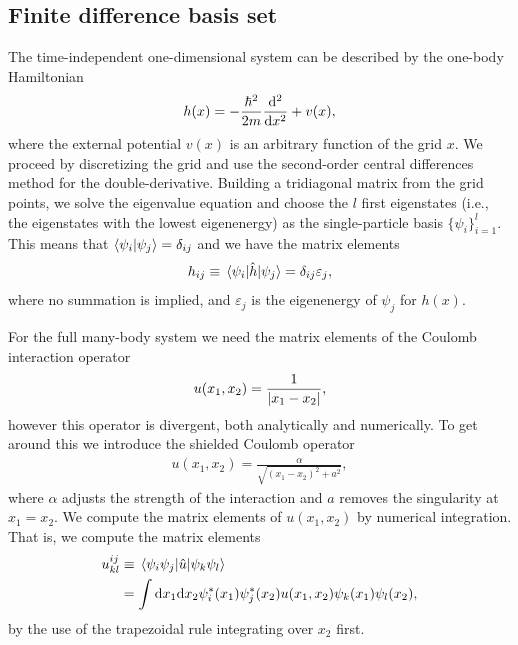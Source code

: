 \documentclass[twocolumn,superscriptaddress,unsortedaddress,
 amsmath,amssymb,
 aps,
]{revtex4-2}
\begin{document}
    \subsection{Finite difference basis set}
        The time-independent one-dimensional system can be described by the one-body
        Hamiltonian
        \begin{align}
            h(x) = -\frac{\hbar^2}{2m}\dv[2]{}{x}
            + v(x),
        \end{align}
        where the external potential $v(x)$ is an arbitrary function of the grid $x$.
        We proceed by discretizing the grid and use the second-order central differences
        method for the double-derivative.
        Building a tridiagonal matrix from the grid points, we solve the eigenvalue
        equation and choose the $l$ first eigenstates (i.e., the eigenstates with the
        lowest eigenenergy) as the single-particle basis $\{\psi_i\}_{i = 1}^l$.
        This means that $\braket{\psi_i}{\psi_j} = \delta_{ij}$ and we have
        the matrix elements
        \begin{align}
            h_{ij} \equiv \mel{\psi_i}{\hat{h}}{\psi_j}
            = \delta_{ij}\varepsilon_j,
        \end{align}
        where no summation is implied, and $\varepsilon_j$ is the eigenenergy of
        $\psi_j$ for $h(x)$.

        For the full many-body system we need the matrix elements of the Coulomb
        interaction operator
        \begin{align}
            u(x_1, x_2) = \frac{1}{\abs{x_1 - x_2}},
        \end{align}
        however this operator is divergent, both analytically and numerically.
        To get around this we introduce the shielded Coulomb operator \cite{su-coulomb}
        \begin{align}
            u(x_1, x_2) = \frac{\alpha}{\sqrt{(x_1 - x_2)^2 + a^2}},
        \end{align}
        where $\alpha$ adjusts the strength of the interaction and $a$ removes
        the singularity at $x_1 = x_2$.
        We compute the matrix elements of $u(x_1, x_2)$ by numerical integration.
        That is, we compute the matrix elements
        \begin{align}
            u^{ij}_{kl}
            &\equiv \mel{\psi_i\psi_j}{\hat{u}}{\psi_k\psi_l}
            \\
            &= \int\dd x_1 \dd x_2
            \psi_i^{*}(x_1)\psi_j^{*}(x_2)u(x_1, x_2)
            \psi_k(x_1)\psi_l(x_2),
        \end{align}
        by the use of the trapezoidal rule integrating over $x_2$ first.
        
\end{document}
